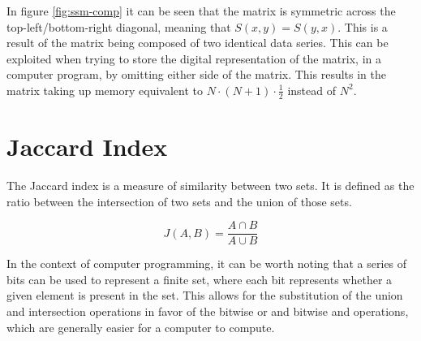 \documentclass[a4paper]{article}
\begin{document}
In figure \ref{fig:ssm-comp} it can be seen that the matrix is symmetric across the top-left/bottom-right diagonal, meaning that $S(x,y)=S(y,x)$. This is a result of the matrix being composed of two identical data series. This can be exploited when trying to store the digital representation of the matrix, in a computer program, by omitting either side of the matrix. This results in the matrix taking up memory equivalent to $N \cdot (N+1) \cdot \frac{1}{2}$ instead of $N^2$.

\section{Jaccard Index}\label{sec:theory-jaccard}

The Jaccard index is a measure of similarity between two sets. It is defined as the ratio between the intersection of two sets and the union of those sets. \cite{jaccard}

\[ J(A,B) = \frac{ A \cap B }{ A \cup B} \]

In the context of computer programming, it can be worth noting that a series of bits can be used to represent a finite set, where each bit represents whether a given element is present in the set. This allows for the substitution of the union and intersection operations in favor of the bitwise or and bitwise and operations, which are generally easier for a computer to compute.

\printbibliography

%
%
\end{document}
